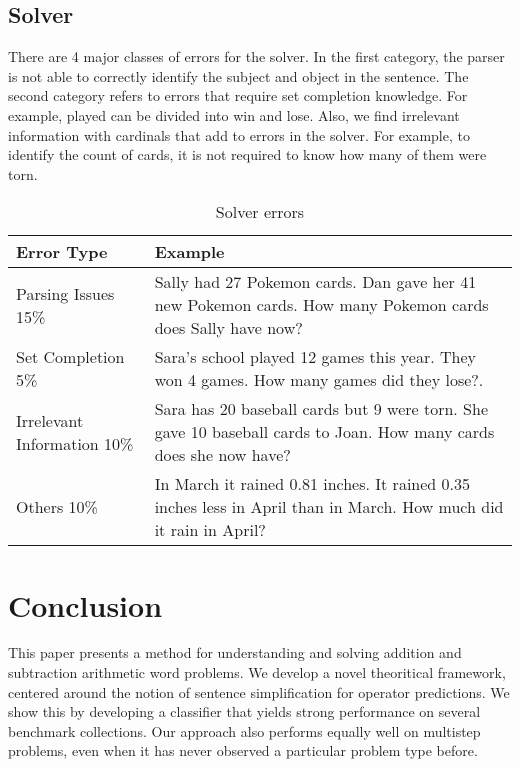 \documentclass[11pt]{article}
\begin{document}
\subsection{Solver}
There are 4 major classes of errors for the solver. In the first category, the parser is not able to correctly identify the subject and object in the sentence. The second category refers to errors that require set completion knowledge. For example, played can be divided into win and lose. Also, we find irrelevant information with cardinals that add to errors in the solver. For example, to identify the count of cards, it is not required to know how many of them were torn.
\begin{table}[h!]
\centering
\begin{tabular}{|m{2cm}|m{4 cm}|}
\hline
 \textbf{Error Type} & \textbf{Example}\\ \hline
Parsing Issues 15\% & Sally had 27 Pokemon cards. Dan gave her 41 new Pokemon cards. How many Pokemon cards does Sally have now? \\ \hline
Set Completion 5\% & Sara’s school played 12 games this year. They won 4 games. How many games did they lose?. \\ \hline
Irrelevant Information 10\% & Sara has 20 baseball cards but 9 were torn. She gave 10 baseball cards to Joan. How many cards does she now have? \\ \hline
Others 10\% & In March it rained 0.81 inches. It rained 0.35 inches less in April than in March. How much did it rain in April?  \\ \hline
\end{tabular}
\caption{Solver errors}
\label{figure:16}
\end{table}


\section{Conclusion}\label{sec:conclusion}
This paper presents a method for understanding and solving addition and subtraction arithmetic word problems. We develop a novel theoritical framework, centered around the notion of sentence simplification for operator predictions. We show this by developing a classifier that yields strong performance on several benchmark collections. Our approach also performs equally well on multistep problems, even when it has never observed a particular problem type before.



\end{document}
